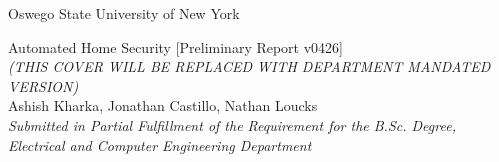 \documentclass[a4paper,11pt]{report}
\title{}
\date{February 15, 2020}
\author{Nathan Louck}
\begin{document}
	\begin{titlepage}
		\begin{center}
			\large
			Oswego State University of New York \\ 
			\vspace{2.5in}
		
			Automated Home Security [Preliminary Report v0426] \\ 
			\tiny\textit{(THIS COVER WILL BE REPLACED WITH DEPARTMENT MANDATED VERSION)}\\
			\vspace{2in}
			\normalsize 
			Ashish Kharka, Jonathan Castillo, Nathan Loucks \\
			\vspace{0.5in}
			\small\textit{
				Submitted in Partial Fulfillment of the Requirement for the B.Sc. Degree, 	\\Electrical and Computer Engineering Department
			}
		\end{center}
	\end{titlepage}
	\newpage
\end{document}
